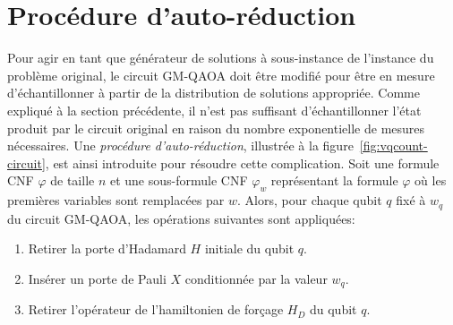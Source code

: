 




\section{Procédure d'auto-réduction}
\label{sec:procedure-auto-reduction}

Pour agir en tant que générateur de solutions à sous-instance de l'instance du problème original, le circuit GM-QAOA doit être modifié pour être en mesure d'échantillonner à partir de la distribution de solutions appropriée. Comme expliqué à la section précédente, il n'est pas suffisant d'échantillonner l'état produit par le circuit original en raison du nombre exponentielle de mesures nécessaires. Une \textit{procédure d'auto-réduction}, illustrée à la figure~\ref{fig:vqcount-circuit}, est ainsi introduite pour résoudre cette complication. Soit une formule CNF $\varphi$ de taille $n$ et une sous-formule CNF $\varphi_{w}$ représentant la formule $\varphi$ où les premières variables sont remplacées par $w$. Alors, pour chaque qubit $q$ fixé à $w_{q}$ du circuit GM-QAOA, les opérations suivantes sont appliquées:

\begin{enumerate}[(1)]
    \item Retirer la porte d'Hadamard $H$ initiale du qubit $q$.
    \item Insérer un porte de Pauli $X$ conditionnée par la valeur $w_{q}$.
    \item Retirer l'opérateur de l'hamiltonien de forçage $H_{D}$ du qubit $q$.
\end{enumerate}

